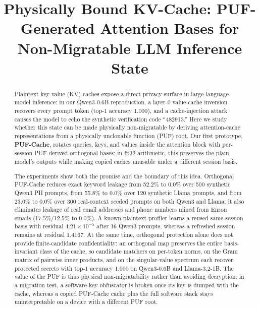 \documentclass[conference,compsoc]{IEEEtran}
\theoremstyle{definition}
\theoremstyle{plain}
\newcommand{\sys}{PUF-Cache}
\begin{document}
\title{Physically Bound KV-Cache: PUF-Generated Attention Bases for Non-Migratable LLM Inference State}

\author{}

\maketitle

\begin{abstract}
Plaintext key-value (KV) caches expose a direct privacy surface in large language model inference: in our Qwen3-0.6B reproduction, a layer-0 value-cache inversion recovers every prompt token (top-1 accuracy 1.000), and a cache-injection attack causes the model to echo the synthetic verification code ``482913.'' Here we study whether this state can be made physically non-migratable by deriving attention-cache representations from a physically unclonable function (PUF) root. Our first prototype, \textbf{\sys}, rotates queries, keys, and values inside the attention block with per-session PUF-derived orthogonal bases; in fp32 arithmetic, this preserves the plain model's outputs while making copied caches unusable under a different session basis.

The experiments show both the promise and the boundary of this idea. Orthogonal \sys{} reduces exact keyword leakage from 52.2\% to 0.0\% over 500 synthetic Qwen3 PII prompts, from 55.8\% to 0.0\% over 120 synthetic Llama prompts, and from 23.0\% to 0.0\% over 300 real-context seeded prompts on both Qwen3 and Llama; it also eliminates leakage of real email addresses and phone numbers mined from Enron emails (17.5\%/12.5\% to 0.0\%). A known-plaintext profiler learns a reused same-session basis with residual $4.21\times10^{-5}$ after 16 Qwen3 prompts, whereas a refreshed session remains at residual 1.4167. At the same time, orthogonal protection alone does not provide finite-candidate confidentiality: an orthogonal map preserves the entire basis-invariant class of the cache, so candidate matchers on per-token norms, on the Gram matrix of pairwise inner products, and on the singular-value spectrum each recover protected secrets with top-1 accuracy 1.000 on Qwen3-0.6B and Llama-3.2-1B. The value of the PUF is thus physical non-migratability rather than avoiding decryption: in a migration test, a software-key obfuscator is broken once its key is dumped with the cache, whereas a copied \sys{} cache plus the full software stack stays uninterpretable on a device with a different PUF root.


\end{abstract}
\end{document}
